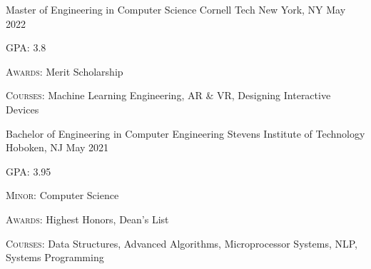 

\begin{cventries}

  \cventry
  {Master of Engineering in Computer Science} %
  {Cornell Tech} %
  {New York, NY} %
  {May 2022} %
  {
    \begin{cvitems}
      \item \textsc{GPA:} 3.8
      \item \textsc{Awards:} Merit Scholarship
      \item \textsc{Courses:} Machine Learning Engineering, AR \& VR, Designing Interactive Devices
    \end{cvitems}
  }

  \cventry
  {Bachelor of Engineering in Computer Engineering} %
  {Stevens Institute of Technology} %
  {Hoboken, NJ} %
  {May 2021} %
  {
    \begin{cvitems} %
      \item \textsc{GPA:} 3.95
      \item \textsc{Minor:} Computer Science
      \item \textsc{Awards:} Highest Honors, Dean's List
      \item \textsc{Courses:} Data Structures, Advanced Algorithms, Microprocessor Systems, NLP, Systems Programming
    \end{cvitems}
  }

\end{cventries}
